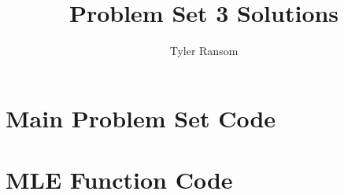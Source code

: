 \documentclass[12pt,english]{article}
\title{Problem Set 3 Solutions}
\author{Tyler Ransom}
\date{}
\begin{document}
\maketitle

\section{Main Problem Set Code}


\pagebreak{}
\section{MLE Function Code}


\end{document}
